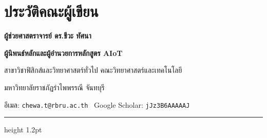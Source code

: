 \chapter*{ประวัติคณะผู้เขียน}

\begin{center}
\begin{minipage}[c]{0.26\textwidth}
    \centering
\end{minipage}
\hfill
\begin{minipage}[c]{0.70\textwidth}
    {\fontsize{18}{22}\selectfont\bfseries\color{rbruNavy} ผู้ช่วยศาสตราจารย์ ดร.ชีวะ ทัศนา\par}
    \vspace{2pt}
    {\fontsize{12}{15}\selectfont\bfseries\color{durianGold} ผู้นิพนธ์หลักและผู้อำนวยการหลักสูตร AIoT\par}
    \vspace{4pt}
    {\fontsize{11}{14}\selectfont สาขาวิชาฟิสิกส์และวิทยาศาสตร์ทั่วไป คณะวิทยาศาสตร์และเทคโนโลยี\par}
    {\fontsize{11}{14}\selectfont มหาวิทยาลัยราชภัฏรำไพพรรณี จันทบุรี\par}
    {\fontsize{10}{13}\selectfont อีเมล: \texttt{chewa.t@rbru.ac.th} \textbar\ Google Scholar: \texttt{jJz3B6AAAAAJ}\par}
\end{minipage}
\end{center}

\vspace{0.4cm}
{\color{rbruGold}\hrule height 1.2pt}
\vspace{0.4cm}


